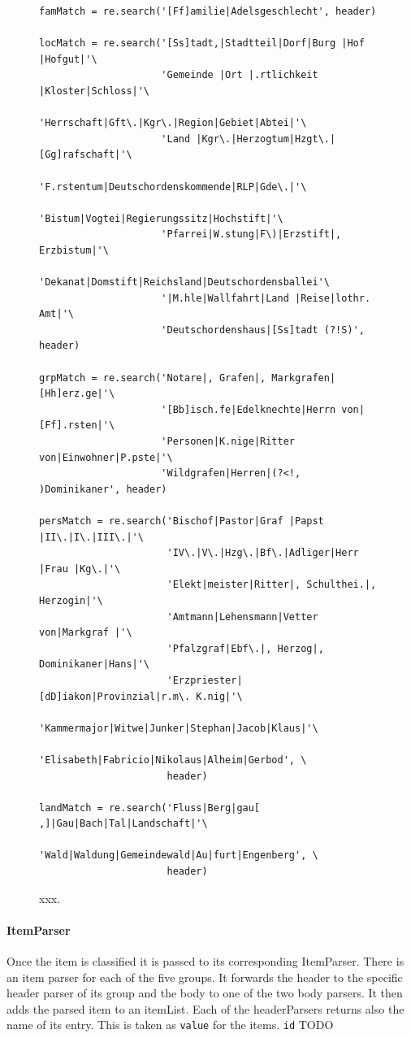 \begin{figure}
\centering
\begin{verbatim}
famMatch = re.search('[Ff]amilie|Adelsgeschlecht', header)

locMatch = re.search('[Ss]tadt,|Stadtteil|Dorf|Burg |Hof |Hofgut|'\
                     'Gemeinde |Ort |.rtlichkeit |Kloster|Schloss|'\
                     'Herrschaft|Gft\.|Kgr\.|Region|Gebiet|Abtei|'\
                     'Land |Kgr\.|Herzogtum|Hzgt\.|[Gg]rafschaft|'\
                     'F.rstentum|Deutschordenskommende|RLP|Gde\.|'\
                     'Bistum|Vogtei|Regierungssitz|Hochstift|'\
                     'Pfarrei|W.stung|F\)|Erzstift|, Erzbistum|'\
                     'Dekanat|Domstift|Reichsland|Deutschordensballei'\
                     '|M.hle|Wallfahrt|Land |Reise|lothr. Amt|'\
                     'Deutschordenshaus|[Ss]tadt (?!S)', header)

grpMatch = re.search('Notare|, Grafen|, Markgrafen|[Hh]erz.ge|'\
                     '[Bb]isch.fe|Edelknechte|Herrn von|[Ff].rsten|'\
                     'Personen|K.nige|Ritter von|Einwohner|P.pste|'\
                     'Wildgrafen|Herren|(?<!, )Dominikaner', header)

persMatch = re.search('Bischof|Pastor|Graf |Papst |II\.|I\.|III\.|'\
                      'IV\.|V\.|Hzg\.|Bf\.|Adliger|Herr |Frau |Kg\.|'\
                      'Elekt|meister|Ritter|, Schulthei.|, Herzogin|'\
                      'Amtmann|Lehensmann|Vetter von|Markgraf |'\
                      'Pfalzgraf|Ebf\.|, Herzog|, Dominikaner|Hans|'\
                      'Erzpriester|[dD]iakon|Provinzial|r.m\. K.nig|'\
                      'Kammermajor|Witwe|Junker|Stephan|Jacob|Klaus|'\
                      'Elisabeth|Fabricio|Nikolaus|Alheim|Gerbod', \
                      header)

landMatch = re.search('Fluss|Berg|gau[ ,]|Gau|Bach|Tal|Landschaft|'\
                      'Wald|Waldung|Gemeindewald|Au|furt|Engenberg', \
                      header)

\end{verbatim}
\label{fig:regex}
\caption{xxx.}
\end{figure}


\paragraph{ItemParser}
Once the item is classified it is passed to its corresponding ItemParser. There is an item parser for each of the five groups. It forwards the header to the specific header parser of its group and the body to one of the two body parsers. It then adds the parsed item to an itemList.
Each of the headerParsers returns also the name of its entry. This is taken as \texttt{value} for the items. \texttt{id} TODO


